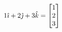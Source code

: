 \documentclass[preview]{standalone}
\begin{document}
\begin{align*}
\special{dvisvgm:raw <g id='unique000'>}1\hat{\imath}+2\hat{\jmath}+3\hat{k}=\begin{bmatrix}1\\2\\3\end{bmatrix}\special{dvisvgm:raw </g>}
\end{align*}
\end{document}
